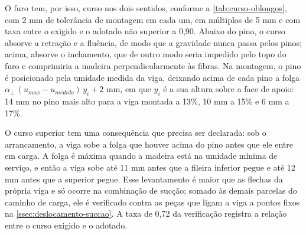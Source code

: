 O furo tem, por isso, curso nos dois sentidos, conforme a
\autoref{tab:curso-oblongos}, com 2 mm de tolerância de montagem em cada um, em
múltiplos de 5 mm e com taxa entre o exigido e o adotado não superior a 0,90. Abaixo do pino, o curso absorve a retração e
a fluência, de modo que a gravidade nunca passa pelos pinos; acima, absorve o
inchamento, que de outro modo seria impedido pelo topo do furo e comprimiria a
madeira perpendicularmente às fibras. Na montagem, o pino é posicionado pela
umidade medida da viga, deixando acima de cada pino a folga
$\alpha_\perp\,(u_{max} - u_{medido})\,y_i + 2$ mm, em que $y_i$ é a sua altura
sobre a face de apoio: 14 mm no pino mais alto para a viga montada a 13\%, 10 mm
a 15\% e 6 mm a 17\%.


O curso superior tem uma consequência que precisa ser declarada: sob o
arrancamento, a viga sobe a folga que houver acima do pino antes que ele entre em
carga. A folga é máxima quando a madeira está na umidade mínima de serviço, e
então a viga sobe até 11 mm antes que a fileira inferior pegue e até 12 mm antes
que a superior pegue. Esse levantamento é maior que as flechas da própria viga e
só ocorre na combinação de sucção; somado às demais parcelas do caminho de carga,
ele é verificado contra as peças que ligam a viga a pontos fixos na
\autoref{ssec:deslocamento-succao}. A taxa de 0,72 da verificação registra a
relação entre o curso exigido e o adotado.


